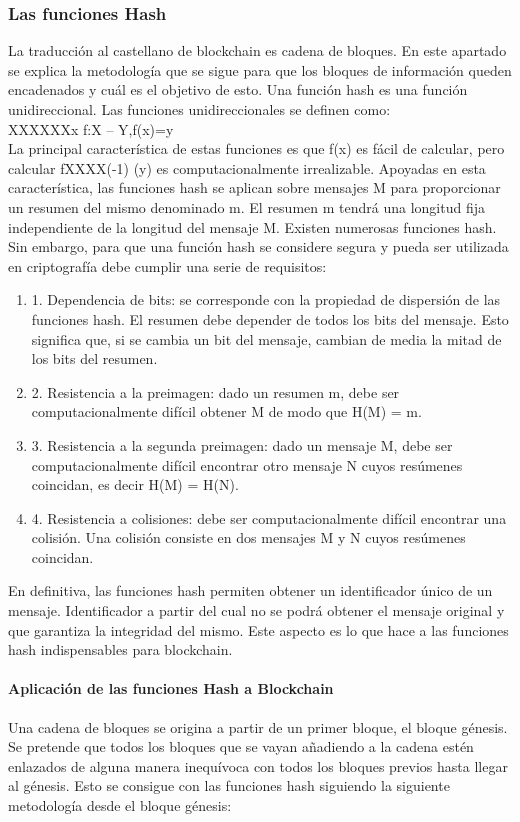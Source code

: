 \subsubsection{Las funciones Hash}
La traducción al castellano de blockchain es cadena de bloques. En este apartado se explica la metodología que se sigue para que los bloques de información queden encadenados y cuál es el objetivo de esto.
Una función hash es una función unidireccional. Las funciones unidireccionales se definen como:\\

XXXXXXx f:X -- Y,f(x)=y \\
La principal característica de estas funciones es que f(x) es fácil de calcular, pero calcular fXXXX(-1) (y) es computacionalmente irrealizable. Apoyadas en esta característica, las funciones hash se aplican sobre mensajes M para proporcionar un resumen del mismo denominado m. El resumen m tendrá una longitud fija independiente de la longitud del mensaje M.
Existen numerosas funciones hash. Sin embargo, para que una función hash se considere segura y pueda ser utilizada en criptografía debe cumplir una serie de requisitos:

\begin{enumerate}
	\item 1.	Dependencia de bits: se corresponde con la propiedad de dispersión de las funciones hash. El resumen debe depender de todos los bits del mensaje. Esto significa que, si se cambia un bit del mensaje, cambian de media la mitad de los bits del resumen.
	\item 2.	Resistencia a la preimagen: dado un resumen m, debe ser computacionalmente difícil obtener M de modo que H(M) = m.
	\item 3.	Resistencia a la segunda preimagen: dado un mensaje M, debe ser computacionalmente difícil encontrar otro mensaje N cuyos resúmenes coincidan, es decir H(M) = H(N).
	\item 4.	Resistencia a colisiones: debe ser computacionalmente difícil encontrar una colisión. Una colisión consiste en dos mensajes M y N cuyos resúmenes coincidan. 
\end{enumerate}

En definitiva, las funciones hash permiten obtener un identificador único de un mensaje. Identificador a partir del cual no se podrá obtener el mensaje original y que garantiza la integridad del mismo. Este aspecto es lo que hace a las funciones hash indispensables para blockchain.

\paragraph{Aplicación de las funciones Hash a Blockchain}
Una cadena de bloques se origina a partir de un primer bloque, el bloque génesis. Se pretende que todos los bloques que se vayan añadiendo a la cadena estén enlazados de alguna manera inequívoca con todos los bloques previos hasta llegar al génesis. Esto se consigue con las funciones hash siguiendo la siguiente metodología desde el bloque génesis:

